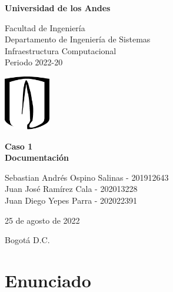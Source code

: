 \documentclass[letterpaper, 11pt]{article}
\begin{document}
\begin{titlepage}
\centering
{\bfseries\LARGE Universidad de los Andes \par}
\vspace{1cm}
{\Large Facultad de Ingeniería \\ Departamento de Ingeniería de Sistemas \\ Infraestructura Computacional \\ Periodo 2022-20\par}
\vspace{2.0cm}
{\includegraphics[width=0.15\textwidth]{imagenes/Uniandes.png}\par}
\vspace{2.0cm}
{\bfseries \LARGE Caso 1\\Documentación\par}
\vspace{2.0cm}
\vfill

\vfill

Sebastian Andrés Ospino Salinas - 201912643 \\ Juan José Ramírez Cala - 202013228 \\ Juan Diego Yepes Parra - 202022391 \par
\vfill
{\Large 25 de agosto de 2022 \par}
{\Large Bogotá D.C. \par}
\end{titlepage}

\tableofcontents
\pagebreak

\section{Enunciado}
\end{document}

